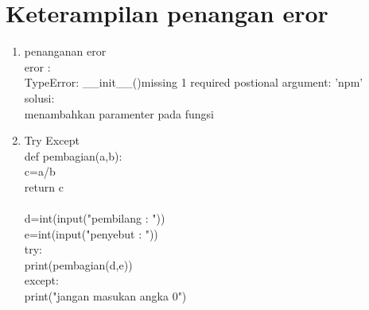 \chapter*{Keterampilan penangan eror}

\begin{enumerate}
	\item penanganan eror\\
	eror :\\
	TypeError: \_\_init\_\_()missing 1 required postional argument: 'npm'\\
	solusi:\\
	menambahkan paramenter pada fungsi\\
	
	\item Try Except\\
	def pembagian(a,b):\\
    c=a/b\\
    return c\\
\\
d=int(input("pembilang : "))\\
e=int(input("penyebut : "))\\
try:\\
    print(pembagian(d,e))\\
except:\\
    print("jangan masukan angka 0")\\

\end{enumerate}
